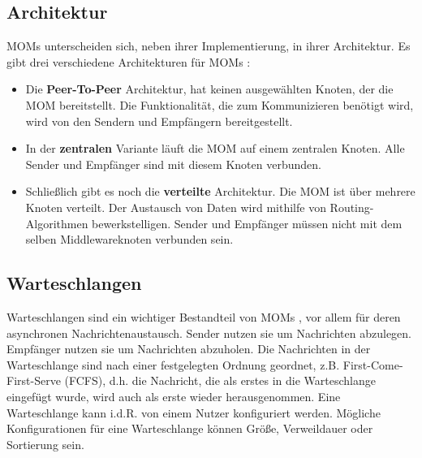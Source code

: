 \subsection{Architektur}
MOMs unterscheiden sich, neben ihrer Implementierung, in ihrer Architektur. Es gibt drei verschiedene Architekturen für MOMs \cite{Rathfelder2013}:
\begin{itemize}
\item Die \textbf{Peer-To-Peer} Architektur, hat keinen ausgewählten Knoten, der die MOM bereitstellt. Die Funktionalität, die zum Kommunizieren benötigt wird, wird von den Sendern und Empfängern bereitgestellt.
\item In der \textbf{zentralen} Variante läuft die MOM auf einem zentralen Knoten. Alle Sender und Empfänger sind mit diesem Knoten verbunden. 
\item Schließlich gibt es noch die \textbf{verteilte} Architektur. Die MOM ist über mehrere Knoten verteilt. Der Austausch von Daten wird mithilfe von Routing-Algorithmen bewerkstelligen. Sender und Empfänger müssen nicht mit dem selben Middlewareknoten verbunden sein.
\end{itemize}  

\subsection{Warteschlangen}
Warteschlangen sind ein wichtiger Bestandteil von MOMs \cite{Curry05}, vor allem für deren asynchronen Nachrichtenaustausch. Sender nutzen sie um Nachrichten abzulegen. Empfänger nutzen sie um Nachrichten abzuholen. Die Nachrichten in der Warteschlange sind nach einer festgelegten Ordnung geordnet, z.B. First-Come-First-Serve (FCFS), d.h. die Nachricht, die als erstes in die Warteschlange eingefügt wurde, wird auch als erste wieder herausgenommen. Eine Warteschlange kann i.d.R. von einem Nutzer konfiguriert werden. Mögliche Konfigurationen für eine Warteschlange können Größe, Verweildauer oder Sortierung sein.

